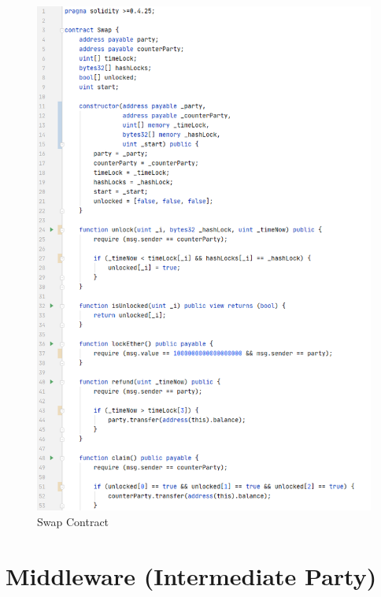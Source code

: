 \begin{figure}[h]
	\includegraphics[width=0.7\paperwidth]{swap_contract}
	\caption{Swap Contract}
	\label{fig:swap_contract}
\end{figure}
\clearpage

\section{Middleware (Intermediate Party)}
\label{sec:chapter04:middleware}

